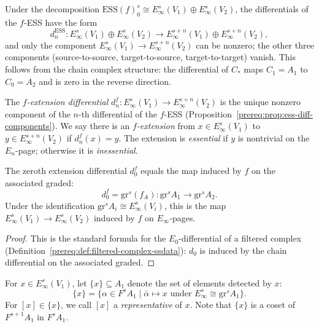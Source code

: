 \begin{proposition}\label{prereq:prop:ess-diff-components}
    Under the decomposition $\mathrm{ESS}(f)_0^{s} \cong E_\infty^{s}(V_1) \oplus E_\infty^{s}(V_2)$, the differentials of the $f$-ESS have the form
    $$d_n^{\mathrm{ESS}}: E_\infty^{s}(V_1) \oplus E_\infty^{s}(V_2) \to E_\infty^{s+n}(V_1) \oplus E_\infty^{s+n}(V_2),$$
    and only the component $E_\infty^{s}(V_1) \to E_\infty^{s+n}(V_2)$ can be nonzero; the other three components (source-to-source, target-to-source, target-to-target) vanish. This follows from the chain complex structure: the differential of $C_*$ maps $C_1 = A_1$ to $C_0 = A_2$ and is zero in the reverse direction.
\end{proposition}

\begin{definition}\label{prereq:def:f-extension-diff}
    The \emph{$f$-extension differential} $d_n^f: E_\infty^{s}(V_1) \to E_\infty^{s+n}(V_2)$ is the unique nonzero component of the $n$-th differential of the $f$-ESS (Proposition~\ref{prereq:prop:ess-diff-components}). We say there is an \emph{$f$-extension} from $x \in E_\infty^{s}(V_1)$ to $y \in E_\infty^{s+n}(V_2)$ if $d_n^f(x) = y$. The extension is \emph{essential} if $y$ is nontrivial on the $E_n$-page; otherwise it is \emph{inessential}.
\end{definition}

\begin{axiom}\label{prereq:ax:ess-d0}
    \notready
    The zeroth extension differential $d_0^f$ equals the map induced by $f$ on the associated graded:
    $$d_0^f = \mathrm{gr}^s(f_A): \mathrm{gr}^s A_1 \to \mathrm{gr}^s A_2.$$
    Under the identification $\mathrm{gr}^s A_i \cong E_\infty^s(V_i)$, this is the map $E_\infty^s(V_1) \to E_\infty^s(V_2)$ induced by $f$ on $E_\infty$-pages.
\end{axiom}
\begin{proof}\leanok This is the standard formula for the $E_0$-differential of a filtered complex (Definition~\ref{prereq:def:filtered-complex-ssdata}): $d_0$ is induced by the chain differential on the associated graded.\end{proof}

\begin{notation}\label{prereq:not:representatives}
    \leanok
    For $x \in E_\infty^{s}(V_1)$, let $\{x\} \subseteq A_1$ denote the set of elements detected by $x$:
    $$\{x\} = \{ \alpha \in F^s A_1 \mid \bar{\alpha} \mapsto x \text{ under } E_\infty^{s} \cong \mathrm{gr}^s A_1 \}.$$
    For $[x] \in \{x\}$, we call $[x]$ a \emph{representative} of $x$. Note that $\{x\}$ is a coset of $F^{s+1}A_1$ in $F^s A_1$.
\end{notation}

